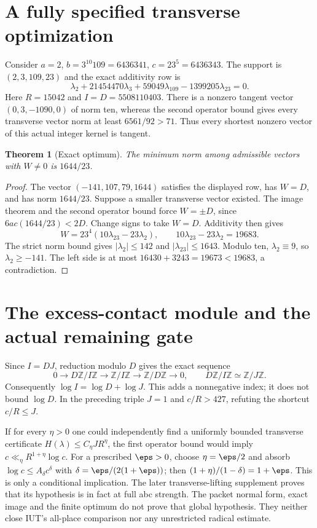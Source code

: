 \documentclass[11pt]{amsart}
\newtheorem{theorem}{Theorem}[section]
\theoremstyle{definition}\newtheorem{definition}[theorem]{Definition}
\theoremstyle{remark}\newtheorem{remark}[theorem]{Remark}
\newcommand{\Z}{\mathbb Z}\newcommand{\N}{\mathbb N}
\begin{document}
\section{A fully specified transverse optimization}
Consider $a=2$, $b=3^{10}109=6436341$, $c=23^5=6436343$. The support is $(2,3,109,23)$ and the exact additivity row is
\[
 \lambda_2+21454470\lambda_3+59049\lambda_{109}-1399205\lambda_{23}=0.
\]
Here $R=15042$ and $I=D=5508110403$. There is a nonzero tangent vector $(0,3,-1090,0)$ of norm ten, whereas the second operator bound gives every transverse vector norm at least $6561/92>71$. Thus every shortest nonzero vector of this actual integer kernel is tangent.
\begin{theorem}[Exact optimum]\label{thm:optimum}
The minimum norm among admissible vectors with $W\ne0$ is $1644/23$.
\end{theorem}
\begin{proof}
The vector $(-141,107,79,1644)$ satisfies the displayed row, has $W=D$, and has norm $1644/23$. Suppose a smaller transverse vector existed. The image theorem and the second operator bound force $W=\pm D$, since $6ac(1644/23)<2D$. Change signs to take $W=D$. Additivity then gives
\[
 W=23^4(10\lambda_{23}-23\lambda_2),\qquad
 10\lambda_{23}-23\lambda_2=19683.
\]
The strict norm bound gives $|\lambda_2|\le142$ and $|\lambda_{23}|\le1643$. Modulo ten, $\lambda_2\equiv9$, so $\lambda_2\ge-141$. The left side is at most $16430+3243=19673<19683$, a contradiction.
\end{proof}

\section{The excess-contact module and the actual remaining gate}
Since $I=DJ$, reduction modulo $D$ gives the exact sequence
\[
 0\longrightarrow D\Z/I\Z\longrightarrow\Z/I\Z\longrightarrow\Z/D\Z\longrightarrow0,
 \qquad D\Z/I\Z\simeq\Z/J\Z.
\]
Consequently $\log I=\log D+\log J$. This adds a nonnegative index; it does not bound $\log D$. In the preceding triple $J=1$ and $c/R>427$, refuting the shortcut $c/R\le J$.

If for every $\eta>0$ one could independently find a uniformly bounded transverse certificate $H(\lambda)\le C_\eta J R^\eta$, the first operator bound would imply $c\ll_\eta R^{1+\eta}\log c$. For a prescribed $\eps>0$, choose $\eta=\eps/2$ and absorb $\log c\le A_\delta c^\delta$ with $\delta=\eps/(2(1+\eps))$; then $(1+\eta)/(1-\delta)=1+\eps$. This is only a conditional implication. The later transverse-lifting supplement proves that its hypothesis is in fact at full abc strength.
The packet normal form, exact image and the finite optimum do not prove that global hypothesis. They neither close IUT's all-place comparison nor any unrestricted radical estimate.
\end{document}
